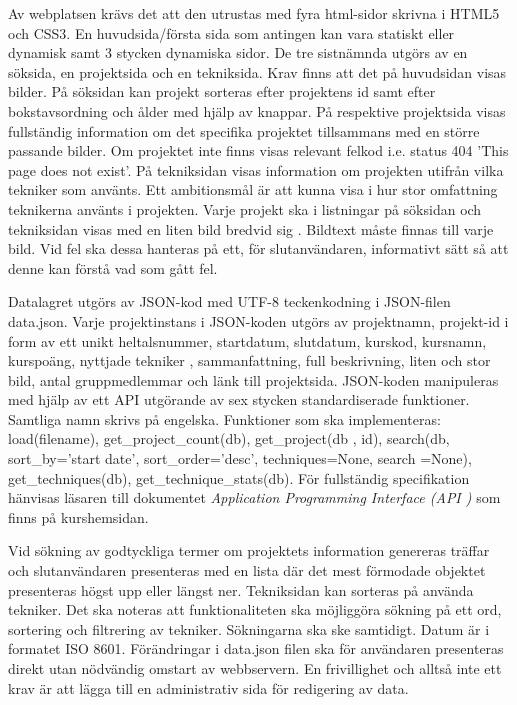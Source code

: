 \documentclass{TDP003mall}
\begin{document}
Av webplatsen krävs det att den utrustas med fyra html-sidor skrivna i HTML5 och
 CSS3. En huvudsida/första sida som antingen kan vara statiskt eller dynamisk samt
 3 stycken dynamiska sidor. De tre sistnämnda utgörs av en söksida, en projektsida
 och en tekniksida. Krav finns att det på huvudsidan visas bilder. På söksidan kan
 projekt sorteras efter projektens id samt efter bokstavsordning och ålder med hjälp av knappar.
 På respektive projektsida visas fullständig information om det specifika
 projektet tillsammans med en större passande bilder. Om projektet inte finns visas
 relevant felkod i.e. status 404 'This page does not exist'. På tekniksidan visas
 information om projekten utifrån vilka tekniker som använts. Ett ambitionsmål är
 att kunna visa i hur stor omfattning teknikerna använts i projekten. Varje projekt
 ska i listningar på söksidan och tekniksidan visas med en liten bild bredvid sig
. Bildtext måste finnas till varje bild. Vid fel ska dessa hanteras på ett, för 
slutanvändaren, informativt sätt så att denne kan förstå vad som gått fel.

Datalagret utgörs av JSON-kod med UTF-8 teckenkodning i JSON-filen data.json. Varje
 projektinstans i JSON-koden utgörs av projektnamn, projekt-id i form av ett unikt
 heltalsnummer, startdatum, slutdatum, kurskod, kursnamn, kurspoäng, nyttjade tekniker
, sammanfattning, full beskrivning, liten och stor bild, antal gruppmedlemmar och
 länk till projektsida. JSON-koden manipuleras med hjälp av ett API utgörande av
 sex stycken standardiserade funktioner. Samtliga namn skrivs på engelska. Funktioner
 som ska implementeras: load(filename), get\_project\_count(db), get\_project(db
, id), search(db, sort\_by='start date', sort\_order='desc', techniques=None, search
=None), get\_techniques(db), get\_technique\_stats(db). För fullständig specifikation
 hänvisas läsaren till dokumentet \textit{Application Programming Interface (API
)} som finns på kurshemsidan.

Vid sökning av godtyckliga termer om projektets information genereras träffar och
 slutanvändaren presenteras med en lista där det mest förmodade objektet presenteras
 högst upp eller längst ner. Tekniksidan kan sorteras på använda tekniker. Det ska
 noteras att funktionaliteten ska möjliggöra sökning på ett ord, sortering och filtrering
 av tekniker. Sökningarna ska ske samtidigt. Datum är i formatet ISO 8601. Förändringar
 i data.json filen ska för användaren presenteras direkt utan nödvändig omstart av
 webbservern. En frivillighet och alltså inte ett krav är att lägga till en administrativ
 sida för redigering av data.
\end{document}
